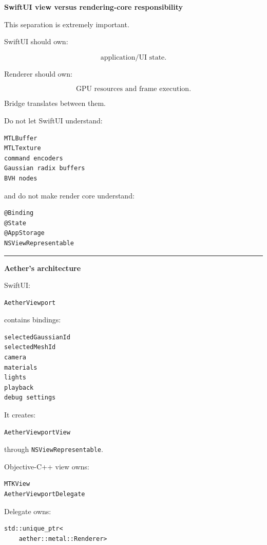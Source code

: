 \textbf{SwiftUI view versus rendering-core responsibility}

This separation is extremely important.

SwiftUI should own:

\[
\text{application/UI state}.
\]

Renderer should own:

\[
\text{GPU resources and frame execution}.
\]

Bridge translates between them.

Do not let SwiftUI understand:

\begin{verbatim}
MTLBuffer
MTLTexture
command encoders
Gaussian radix buffers
BVH nodes
\end{verbatim}

and do not make render core understand:

\begin{verbatim}
@Binding
@State
@AppStorage
NSViewRepresentable
\end{verbatim}

\begin{center}\rule{0.5\linewidth}{0.5pt}\end{center}

\textbf{Aether's architecture}

SwiftUI:

\begin{verbatim}
AetherViewport
\end{verbatim}

contains bindings:

\begin{verbatim}
selectedGaussianId
selectedMeshId
camera
materials
lights
playback
debug settings
\end{verbatim}

It creates:

\begin{verbatim}
AetherViewportView
\end{verbatim}

through \texttt{NSViewRepresentable}.

Objective-C++ view owns:

\begin{verbatim}
MTKView
AetherViewportDelegate
\end{verbatim}

Delegate owns:

\begin{verbatim}
std::unique_ptr<
    aether::metal::Renderer>
\end{verbatim}

